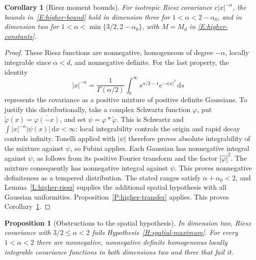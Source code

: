 \documentclass[12pt]{article}
\numberwithin{equation}{section}
\newtheorem{proposition}[theorem]{Proposition}
\newtheorem{corollary}[theorem]{Corollary}
\theoremstyle{definition}
\newcommand{\ud}{\,\mathrm{d}}
\begin{document}
\begin{corollary}[Riesz moment bounds]\label{C:higher-riesz}
  For isotropic Riesz covariance $c|x|^{-\alpha}$, the bounds
  in~\eqref{E:higher-bound} hold in dimension three for
  $1<\alpha<2-\alpha_0$, and in dimension two for
  $1<\alpha<\min\{3/2,2-\alpha_0\}$, with $M=M_d$ in
  \eqref{E:higher-constants}.
\end{corollary}

\begin{proof}
  These Riesz functions are nonnegative, homogeneous of degree
  $-\alpha$, locally integrable since $\alpha<d$, and nonnegative
  definite. For the last property, the identity
  \[
    |x|^{-\alpha}=\frac1{\Gamma(\alpha/2)}
    \int_0^\infty s^{\alpha/2-1}e^{-s|x|^2}\ud s
  \]
  represents the covariance as a positive mixture of positive definite
  Gaussians. To justify this distributionally, take a complex Schwartz
  function $\varphi$, put $\widetilde{\varphi}(x)=\overline{\varphi(-x)}$,
  and set $\psi=\varphi*\widetilde{\varphi}$. This is Schwartz and
  $\int |x|^{-\alpha}|\psi(x)|\ud x<\infty$: local integrability
  controls the origin and rapid decay controls infinity. Tonelli
  applied with $|\psi|$ therefore proves absolute integrability of
  the mixture against $\psi$, so Fubini applies. Each Gaussian has
  nonnegative integral against $\psi$, as follows from its positive
  Fourier transform and the factor $|\widehat{\varphi}|^2$.
  The mixture consequently has nonnegative integral against $\psi$.
  This proves nonnegative definiteness as a tempered distribution.
  The stated ranges satisfy
  $\alpha+\alpha_0<2$, and Lemma~\ref{L:higher-riesz} supplies the
  additional spatial hypothesis with all Gaussian uniformities.
  Proposition~\ref{P:higher-transfer} applies. This proves
  Corollary~\ref{C:higher-riesz}.
\end{proof}

\begin{proposition}[Obstructions to the spatial hypothesis]
  \label{P:higher-obstructions}
  In dimension two, Riesz covariance with $3/2\le\alpha<2$ fails
  Hypothesis~\ref{H:spatial-maximum}. For every $1<\alpha<2$ there
  are nonnegative, nonnegative definite homogeneous locally integrable
  covariance functions in both dimensions two and three that fail it.
\end{proposition}
\end{document}
